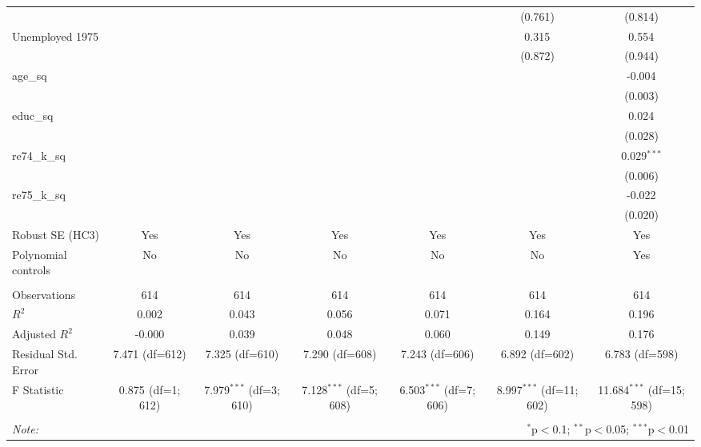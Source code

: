 \begin{table}[!htbp]
\begin{tabular}{@{\extracolsep{5pt}}lcccccc}
& & & & & (0.761) & (0.814) \\
 Unemployed 1975 & & & & & 0.315$^{}$ & 0.554$^{}$ \\
& & & & & (0.872) & (0.944) \\
 age_sq & & & & & & -0.004$^{}$ \\
& & & & & & (0.003) \\
 educ_sq & & & & & & 0.024$^{}$ \\
& & & & & & (0.028) \\
 re74_k_sq & & & & & & 0.029$^{***}$ \\
& & & & & & (0.006) \\
 re75_k_sq & & & & & & -0.022$^{}$ \\
& & & & & & (0.020) \\
 Robust SE (HC3) & Yes & Yes & Yes & Yes & Yes & Yes \\
 Polynomial controls & No & No & No & No & No & Yes \\
\hline \\[-1.8ex]
 Observations & 614 & 614 & 614 & 614 & 614 & 614 \\
 $R^2$ & 0.002 & 0.043 & 0.056 & 0.071 & 0.164 & 0.196 \\
 Adjusted $R^2$ & -0.000 & 0.039 & 0.048 & 0.060 & 0.149 & 0.176 \\
 Residual Std. Error & 7.471 (df=612) & 7.325 (df=610) & 7.290 (df=608) & 7.243 (df=606) & 6.892 (df=602) & 6.783 (df=598) \\
 F Statistic & 0.875$^{}$ (df=1; 612) & 7.979$^{***}$ (df=3; 610) & 7.128$^{***}$ (df=5; 608) & 6.503$^{***}$ (df=7; 606) & 8.997$^{***}$ (df=11; 602) & 11.684$^{***}$ (df=15; 598) \\
\hline
\hline \\[-1.8ex]
\textit{Note:} & \multicolumn{6}{r}{$^{*}$p$<$0.1; $^{**}$p$<$0.05; $^{***}$p$<$0.01} \\
\end{tabular}
\end{table}